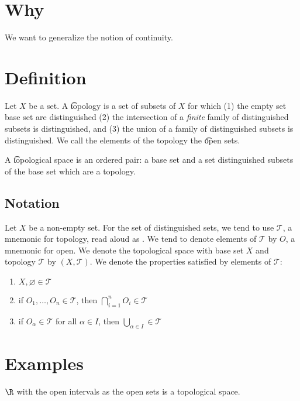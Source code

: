 

\section*{Why}

We want to generalize the notion of continuity.

\section*{Definition}

Let $X$ be a set.
A \t{topology} is a set of subsets of $X$ for which (1) the empty set base set are distinguished (2) the intersection of a \textit{finite} family of distinguished subsets is distinguished, and (3) the union of a family of distinguished subsets is distinguished.
We call the elements of the topology the \t{open sets}.

A \t{topological space} is an ordered pair: a base set and a set distinguished subsets of the base set which are a topology.

\subsection*{Notation}

Let $X$ be a non-empty set.
For the set of distinguished sets, we tend to use $\mathcal{T} $, a mnemonic for topology, read aloud as .
We tend to denote elements of $\mathcal{T} $ by $O$, a mnemonic for open.
We denote the topological space with base set $X$ and topology $\mathcal{T} $ by $(X, \mathcal{T} )$.
We denote the properties satisfied by elements of $\mathcal{T} $:
    \begin{enumerate}
      \item $X, \varnothing \in \mathcal{T} $
      \item if $O_1, \dots , O_n \in \mathcal{T} $, then $\bigcap_{i = 1}^{n} O_i \in \mathcal{T} $
      \item if $O_\alpha  \in \mathcal{T} $ for all $\alpha  \in I$, then $\bigcup_{\alpha  \in I} \in \mathcal{T} $
    \end{enumerate}

\section*{Examples}

$\R $ with the open intervals as the open sets is a topological space.
